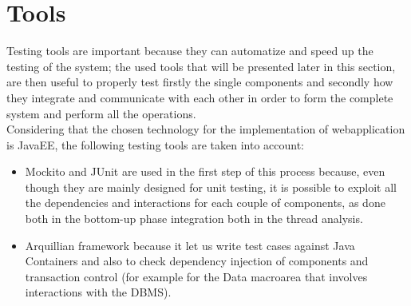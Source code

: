 \documentclass[11pt,a4paper]{report}
\begin{document}
\section{Tools}
Testing tools are important because they can automatize and speed up the testing of the system; the used tools that will be presented later in this section, are then useful to properly test firstly the single components and secondly how they integrate and communicate with each other in order to form the complete system and perform all the operations.\\
Considering that the chosen technology for the implementation of webapplication is JavaEE, the following testing tools are taken into account:
\begin{itemize}
	\item Mockito and JUnit are used in the first step of this process because, even though they are mainly designed for unit testing, it is possible to exploit all the dependencies and interactions for each couple of components, as done  both in the bottom-up phase integration both in the thread analysis.
	\item Arquillian framework because it let us write test cases against Java Containers and also to check dependency injection of components and transaction control (for example for the Data macroarea that involves interactions with the DBMS).
\end{itemize}
\end{document}
